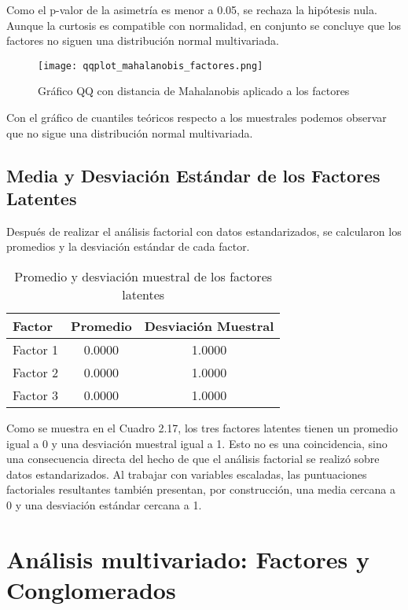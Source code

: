 \documentclass[12pt]{report}
\begin{document}
\noindent Como el p-valor de la asimetría es menor a 0.05, se rechaza la hipótesis nula. Aunque la curtosis es compatible con normalidad, en conjunto se concluye que los factores no siguen una distribución normal multivariada.

\begin{figure}[H]
    \centering
    \texttt{[image: qqplot\_mahalanobis\_factores.png]}
    \caption{Gráfico QQ con distancia de Mahalanobis aplicado a los factores}
\end{figure}
Con el gráfico de cuantiles teóricos respecto a los muestrales podemos observar que no sigue una distribución normal multivariada.

\section{Media y Desviación Estándar de los Factores Latentes}

Después de realizar el análisis factorial con datos estandarizados, se calcularon los promedios y la desviación estándar de cada factor. 

\begin{table}[H]
\centering
\begin{tabular}{|l|c|c|}
\hline
\textbf{Factor} & \textbf{Promedio} & \textbf{Desviación Muestral} \\
\hline
Factor 1 & 0.0000 & 1.0000 \\
Factor 2 & 0.0000 & 1.0000 \\
Factor 3 & 0.0000 & 1.0000 \\
\hline
\end{tabular}
\caption{Promedio y desviación muestral de los factores latentes}
\end{table}

\noindent
Como se muestra en el Cuadro 2.17, los tres factores latentes tienen un promedio igual a 0 y una desviación muestral igual a 1. Esto no es una coincidencia, sino una consecuencia directa del hecho de que el análisis factorial se realizó sobre datos estandarizados. Al trabajar con variables escaladas, las puntuaciones factoriales resultantes también presentan, por construcción, una media cercana a 0 y una desviación estándar cercana a 1.


\chapter{Análisis multivariado: Factores y Conglomerados}
\end{document}
